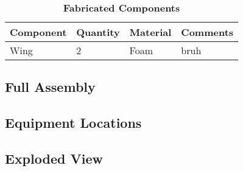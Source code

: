     
    
 \begin{table}[H]
     \begin{center}
     \caption{\textbf{Fabricated Components}} \label{table:fab_components}
     \begin{tabular}{|p{2in}|p{1in}|p{1in}|p{1in}|} %
         \hline \textbf{Component} & \textbf{Quantity} & \textbf{Material} & \textbf{Comments} \\ \hline %
         Wing & 2 & Foam & bruh \\ \hline
     \end{tabular}
     \end{center}
 \end{table}
    
    \subsection{Full Assembly}
    
    \subsection{Equipment Locations}
    
    \subsection{Exploded View}
    
